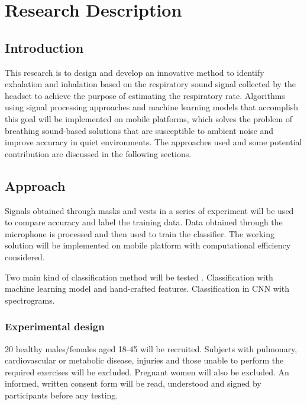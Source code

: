 \chapter{Research Description}
\section{Introduction}
This research is to design and develop an innovative method to identify exhalation and inhalation based on the respiratory sound signal collected by the headset to achieve the purpose of estimating the respiratory rate. Algorithms using signal processing approaches and machine learning models that accomplish this goal will be implemented on mobile platforms, which solves the problem of breathing sound-based solutions that are susceptible to ambient noise and improve accuracy in quiet environments. The approaches used and some potential contribution are discussed in the following sections.

\section{Approach}
Signals obtained through masks and vests in a series of experiment will be used to compare accuracy and label the training data. Data obtained through the microphone is processed and then used to train the classifier. The working solution will be implemented on mobile platform with computational efficiency considered.

Two main kind of classification method will be tested . Classification with machine learning model and hand-crafted features. Classification in CNN with spectrograms.

\subsection{Experimental design}
20 healthy males/females aged 18-45 will be recruited. Subjects with pulmonary, cardiovascular or metabolic disease, injuries and those unable to perform the required exercises will be excluded. Pregnant women will also be excluded. An informed, written consent form will be read, understood and signed by participants before any testing. 

